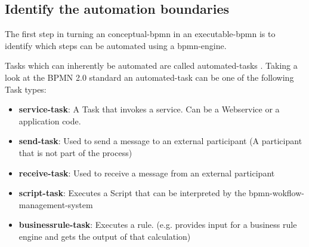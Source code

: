 \subsection{Identify the automation boundaries}
The first step in turning an \gls{conceptual-bpmn} in an  \gls{executable-bpmn} is to identify which steps can be automated using a \gls{bpmn-engine}. 

Tasks which can inherently be automated are called \gls{automated-task}s \cite[p.~317]{fundamentals}. Taking a look at the BPMN 2.0 standard an \gls{automated-task} can be one of the following Task types:
\begin{itemize}
	\item \textbf{\gls{service-task}}: A Task that invokes a service. Can be a Webservice or a application code.
	\item \textbf{\gls{send-task}}: Used to send a message to an external participant (A participant that is not part of the process)
	\item \textbf{\gls{receive-task}}: Used to receive a message from an external participant
	\item \textbf{\gls{script-task}}: Executes a Script that can be interpreted by the \gls{bpmn-wokflow-management-system}
	\item \textbf{\gls{businessrule-task}}: Executes a rule. (e.g. provides input for a business rule engine and gets the output of that calculation)
\end{itemize}

